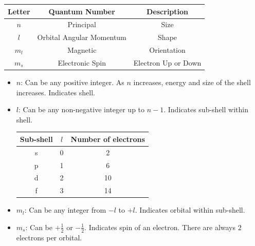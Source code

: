 \documentclass{article}
\begin{document}

\begin{center}
    \begin{tabular}{|c|c|c|}
         \hline
         \textbf{Letter} & \textbf{Quantum Number} & \textbf{Description} \\
         \hline
         $n$ & Principal & Size \\
         $l$ & Orbital Angular Momentum & Shape \\
         $m_l$ & Magnetic & Orientation \\
         $m_s$ & Electronic Spin & Electron Up or Down \\
         \hline
    \end{tabular}
\end{center}

\begin{itemize}
    \item $n$: Can be any positive integer. As $n$ increases, energy and size of the shell increases. Indicates shell.
    \item $l$: Can be any non-negative integer up to $n - 1$. Indicates sub-shell within shell.
    \begin{center}
        \begin{tabular}{|c|c|c|}
            \hline
            \textbf{Sub-shell} & $l$ & Number of electrons \\
            \hline
            s & 0 & 2 \\
            p & 1 & 6 \\
            d & 2 & 10 \\
            f & 3 & 14 \\
            \hline
        \end{tabular}
    \end{center}
    \item $m_l$: Can be any integer from $-l$ to $+l$. Indicates orbital within sub-shell.
    \item $m_s$: Can be $+\frac{1}{2}$ or $-\frac{1}{2}$. Indicates spin of an electron. There are always $2$ electrons per orbital.
\end{itemize}
\end{document}
